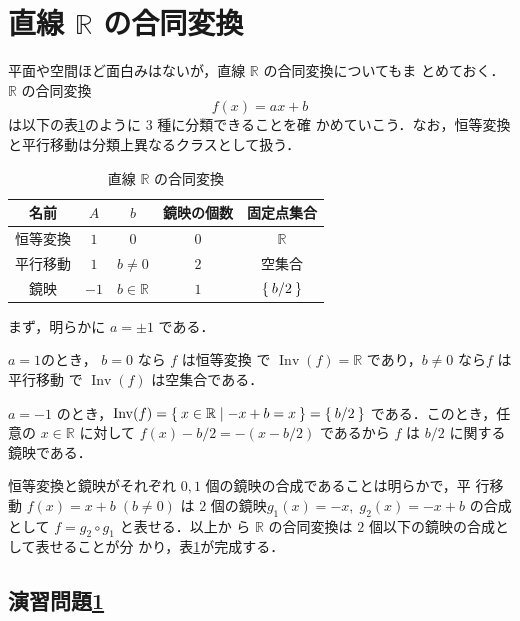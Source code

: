 \documentclass[11pt, uplatex, dvipdfmx, titlepage]{jsarticle}
\DeclareMathOperator{\Inv}{Inv}
\theoremstyle{definition}
\begin{document}
\newpage

\section{ 直線 $\mathbb{R}$ の合同変換}\label{sec:1dim}

平面や空間ほど面白みはないが，直線 $\mathbb{R}$ の合同変換についてもま
とめておく．$\mathbb{R}$ の合同変換
\[
  f(x) = a x + b
\]
は以下の表\ref{tab:classification1}のように $3$ 種に分類できることを確
かめていこう．なお，恒等変換と平行移動は分類上異なるクラスとして扱う．
\begin{table}[h]
  \centering
  \begin{tabular}[h]{|c|c|c|c|c|}\hline
    名前 & $A$ & $b$ & 鏡映の個数 & 固定点集合\\ \hline
    恒等変換 & $1$ & $0$ & $0$ & $\mathbb{R}$\\ 
    平行移動 & $1$ & $b \neq 0$ & $2$ & 空集合\\
    鏡映 & $-1$ & $b \in \mathbb{R}$ & $1$ & $\Set{b/2}$ \\ \hline
  \end{tabular}
  \caption{直線 $\mathbb{R}$ の合同変換}
  \label{tab:classification1}
\end{table}

まず，明らかに $a=\pm 1$ である．

$a=1$のとき， $b=0$ なら $f$ は恒等変換
で $\Inv(f)=\mathbb{R}$ であり，$b\neq 0$ なら$f$ は平行移動
で $\Inv(f)$ は空集合である．

$a=-1$ のとき，$\Inv(f) = \Set{x \in \mathbb{R} | -x+b=x} = \Set{b/2}$
である．このとき，任意の $x \in \mathbb{R}$ に対して $f(x)-b/2 =
-(x-b/2)$ であるから $f$ は $b/2$ に関する鏡映である．

恒等変換と鏡映がそれぞれ $0, 1$ 個の鏡映の合成であることは明らかで，平
行移動 $f(x) = x+b \; (b \neq 0)$ は $2$ 個の鏡映$g_1(x) = -x, \;
g_2(x)=-x+b$ の合成として $f=g_2 \circ g_1$ と表せる．以上か
ら $\mathbb{R}$ の合同変換は $2$ 個以下の鏡映の合成として表せることが分
かり，表\ref{tab:classification1}が完成する．

\subsection*{演習問題\ref{sec:1dim}}
\end{document}
